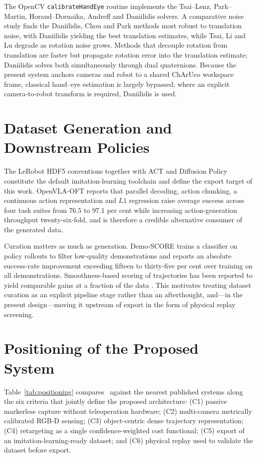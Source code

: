 The OpenCV \texttt{calibrateHandEye} routine implements the Tsai--Lenz,
Park--Martin, Horaud--Dornaika, Andreff and Daniilidis solvers. A comparative
noise study \cite{alihandeye} finds the Daniilidis, Chou and Park methods most
robust to translation noise, with Daniilidis yielding the best translation
estimates, while Tsai, Li and Lu degrade as rotation noise grows. Methods that
decouple rotation from translation are faster but propagate rotation error into
the translation estimate; Daniilidis solves both simultaneously through dual
quaternions. Because the present system anchors cameras and robot to a shared
ChArUco workspace frame, classical hand--eye estimation is largely bypassed;
where an explicit camera-to-robot transform is required, Daniilidis is used.

\section{Dataset Generation and Downstream Policies}
\label{sec:lit-dataset}

The LeRobot HDF5 conventions together with ACT and Diffusion Policy constitute
the default imitation-learning toolchain and define the export target of this
work. OpenVLA-OFT \cite{openvlaoft} reports that parallel decoding, action
chunking, a continuous action representation and $L1$ regression raise average
success across four task suites from $76.5$ to $97.1$ per cent while increasing
action-generation throughput twenty-six-fold, and is therefore a credible
alternative consumer of the generated data.

Curation matters as much as generation. Demo-SCORE \cite{demoscore} trains a
classifier on policy rollouts to filter low-quality demonstrations and reports
an absolute success-rate improvement exceeding fifteen to thirty-five per cent
over training on all demonstrations. Smoothness-based scoring of trajectories
has been reported to yield comparable gains at a fraction of the data
. This motivates treating dataset curation as an
explicit pipeline stage rather than an afterthought, and---in the present
design---moving it upstream of export in the form of physical replay screening.

\section{Positioning of the Proposed System}
\label{sec:positioning}

Table~\ref{tab:positioning} compares \viki\ against the nearest published
systems along the six criteria that jointly define the proposed architecture:
(C1) passive markerless capture without teleoperation hardware; (C2)
multi-camera metrically calibrated RGB-D sensing; (C3) object-centric dense
trajectory representation; (C4) retargeting as a single confidence-weighted
cost functional; (C5) export of an imitation-learning-ready dataset; and (C6)
physical replay used to validate the dataset before export.

